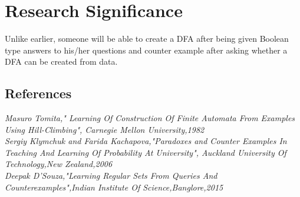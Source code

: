 \documentclass[14pt]{article}
\begin{document}
\section {	Research Significance}   {Unlike earlier, someone will be able to create a DFA after being given Boolean type answers to his/her questions and counter example after asking whether a DFA can be created from data. }
\begin{thebibliography}{}
\section {References}

  
\bibitem{}\textit { Masuro Tomita," Learning Of Construction Of Finite Automata From Examples Using Hill-Climbing", Carnegie Mellon University,1982}\\

\bibitem{}\textit { Sergiy Klymchuk and Farida Kachapova,"Paradoxes and Counter Examples In Teaching And Learning Of Probability At University", Auckland University Of Technology,New Zealand,2006}\\

\bibitem{}\textit {Deepak D'Souza,"Learning Regular Sets 	From Queries And Counterexamples",Indian Institute Of Science,Banglore,2015}
 \end {thebibliography}
\end{document}
